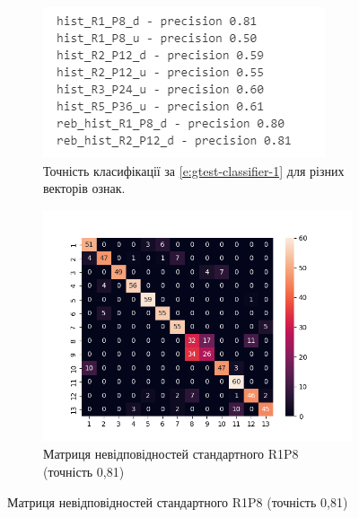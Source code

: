 \begin{figure}[h]
    \begin{subfigure}{0.5\textwidth}
    \includegraphics[width=0.95\linewidth]{img/precision-1.png} 
    \caption{
        Точність класифікації за \ref{e:gtest-classifier-1} для різних векторів ознак.
    }
    \end{subfigure}%
    \begin{subfigure}{0.5\textwidth}
    \includegraphics[width=0.95\linewidth]{img/confusion/hist_R1_P8_d.png}
    \caption{
        Матриця невідповідностей стандартного R1P8 (точність 0,81)
    }
    \end{subfigure}


\end{figure}
